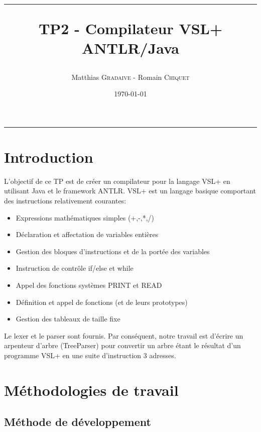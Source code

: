 \documentclass[a4paper, 11pt, oneside]{article}
\title{\hrule \vspace{1cm} TP2 - Compilateur VSL+ ANTLR/Java}
\author{Matthias \textsc{Gradaive} - Romain \textsc{Chiquet}}
\date{\today}
\begin{document}
\pagestyle{fancy}
\lhead{}
\chead{}
\rhead{\leftmark}
\cfoot{}

\clearpage
\thispagestyle{empty}

\maketitle
\hrule
\thispagestyle{empty}

\newpage

\renewcommand{\contentsname}{Sommaire}
\tableofcontents
\thispagestyle{empty}
\newpage
\setcounter{page}{1}

\section*{Introduction}

L'objectif de ce TP est de créer un compilateur pour la langage VSL+ en utilisant Java et le framework ANTLR. VSL+ est un langage basique comportant des instructions relativement courantes:

\begin{itemize}
 \item Expressions mathématiques simples (+,-,*,/)
 \item Déclaration et affectation de variables entières
 \item Gestion des bloques d'instructions et de la portée des variables
 \item Instruction de contrôle if/else et while
 \item Appel des fonctions systèmes PRINT et READ
 \item Définition et appel de fonctions (et de leurs prototypes)
 \item Gestion des tableaux de taille fixe  
\end{itemize}

\vspace{0.5em}

Le lexer et le parser sont fournis. Par conséquent, notre travail est d'écrire un arpenteur d'arbre (TreeParser) pour convertir un arbre étant le résultat d'un programme VSL+ en une suite d'instruction 3 adresses.

\section{Méthodologies de travail}

\subsection{Méthode de développement}
\end{document}

